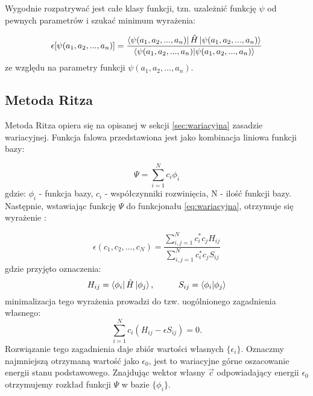\documentclass[a4paper,12pt]{article}
\numberwithin{equation}{section}
\numberwithin{table}{section}
\numberwithin{figure}{section}
\begin{document}
Wygodnie rozpatrywać jest całe klasy funkcji, tzn. uzależnić funkcję $\psi$ od pewnych parametrów i szukać minimum wyrażenia:

\begin{equation} \label{eq:parametry}
\epsilon[\psi(a_1,a_2, ... ,a_n)] = \frac{\bra{\psi(a_1,a_2, ... ,a_n)}\hat{H}\ket{\psi(a_1,a_2, ... ,a_n)}}{\braket{\psi(a_1,a_2, ... ,a_n)|\psi(a_1,a_2, ... ,a_n)}}
\end{equation}
ze względu na parametry funkcji $\psi(a_1,a_2, ... ,a_n)$.
\subsection{Metoda Ritza}
Metoda Ritza opiera się na opisanej w sekcji \ref{sec:wariacyjna} zasadzie wariacyjnej. Funkcja falowa przedstawiona jest jako kombinacja liniowa funkcji bazy:

\begin{equation} \label{eq:ritz}
\Psi = \sum\limits_{i=1}^N c_i \phi_i
\end{equation}
gdzie: $\phi_i$ - funkcja bazy, $c_i$ - współczynniki rozwinięcia, N - ilość funkcji bazy.\\
Następnie, wstawiając funkcję $\Psi$ do funkcjonału \eqref{eq:wariacyjna}, otrzymuje się wyrażenie \cite{piela}:

\begin{equation}
\epsilon(c_1, c_2, ..., c_N) = \frac{\sum_{i,j=1}^N c_i^* c_j H_{ij}}{\sum_{i,j=1}^N c_i^* c_j S_{ij}}
\end{equation}
gdzie przyjęto oznaczenia:
\begin{equation}
H_{ij} = \bra{\phi_i} \hat{H} \ket{\phi_j}, \hspace{1cm} S_{ij} = \braket{\phi_i|\phi_j}
\end{equation}
minimalizacja tego wyrażenia prowadzi do tzw. uogólnionego zagadnienia własnego:
\begin{equation} \label{eq:wlasne}
\sum\limits_{i=1}^N c_i (H_{ij} - \epsilon S_{ij}) = 0.
\end{equation}
Rozwiązanie tego zagadnienia daje zbiór wartości własnych $\{\epsilon_i\}$. Oznaczmy najmniejszą otrzymaną wartość jako $\epsilon_0$, jest to wariacyjne górne oszacowanie energii stanu podstawowego. Znajdując wektor własny $\vec{c}$  odpowiadający energii $\epsilon_0$ otrzymujemy rozkład funkcji $\Psi$ w bazie $\{\phi_i\}$.

\newpage
\end{document}
